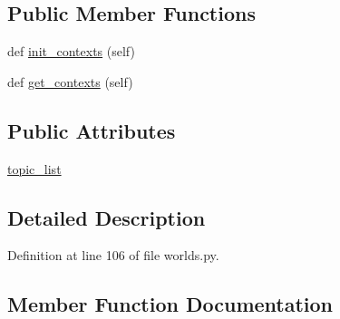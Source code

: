 \subsection*{Public Member Functions}
\begin{DoxyCompactItemize}
\item 
def \hyperlink{classparlai_1_1tasks_1_1wizard__of__wikipedia_1_1worlds_1_1InteractiveSelfchatWorld_a7c8bb5adb1d2d5a94852dd205457dc6b}{init\+\_\+contexts} (self)
\item 
def \hyperlink{classparlai_1_1tasks_1_1wizard__of__wikipedia_1_1worlds_1_1InteractiveSelfchatWorld_ac2a96e3d645041e1e03add8c5cc7ed60}{get\+\_\+contexts} (self)
\end{DoxyCompactItemize}
\subsection*{Public Attributes}
\begin{DoxyCompactItemize}
\item 
\hyperlink{classparlai_1_1tasks_1_1wizard__of__wikipedia_1_1worlds_1_1InteractiveSelfchatWorld_a50745d66f073be01963f68411a94a06b}{topic\+\_\+list}
\end{DoxyCompactItemize}


\subsection{Detailed Description}


Definition at line 106 of file worlds.\+py.



\subsection{Member Function Documentation}
\mbox{\label{classparlai_1_1tasks_1_1wizard__of__wikipedia_1_1worlds_1_1InteractiveSelfchatWorld_ac2a96e3d645041e1e03add8c5cc7ed60}} 
